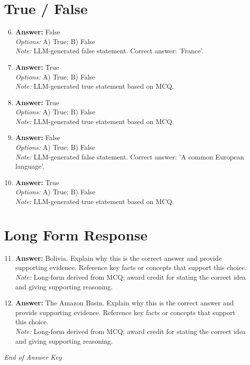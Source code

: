 \documentclass[12pt]{article}
\begin{document}
\section*{True / False}
\begin{enumerate}[label=\arabic*.]
\setcounter{enumi}{5}
\item \textbf{Answer:} False
\\ \textit{Options:} A) True; B) False
\\ \textit{Note:} LLM-generated false statement. Correct answer: 'France'.
\item \textbf{Answer:} True
\\ \textit{Options:} A) True; B) False
\\ \textit{Note:} LLM-generated true statement based on MCQ.
\item \textbf{Answer:} True
\\ \textit{Options:} A) True; B) False
\\ \textit{Note:} LLM-generated true statement based on MCQ.
\item \textbf{Answer:} False
\\ \textit{Options:} A) True; B) False
\\ \textit{Note:} LLM-generated false statement. Correct answer: 'A common European language'.
\item \textbf{Answer:} True
\\ \textit{Options:} A) True; B) False
\\ \textit{Note:} LLM-generated true statement based on MCQ.
\end{enumerate}

\section*{Long Form Response}
\begin{enumerate}[label=\arabic*.]
\setcounter{enumi}{10}
\item \textbf{Answer:} Bolivia. Explain why this is the correct answer and provide supporting evidence. Reference key facts or concepts that support this choice.
\\ \textit{Note:} Long-form derived from MCQ; award credit for stating the correct idea and giving supporting reasoning.
\item \textbf{Answer:} The Amazon Basin. Explain why this is the correct answer and provide supporting evidence. Reference key facts or concepts that support this choice.
\\ \textit{Note:} Long-form derived from MCQ; award credit for stating the correct idea and giving supporting reasoning.
\end{enumerate}

\vfill
\noindent\textit{End of Answer Key}
\end{document}
